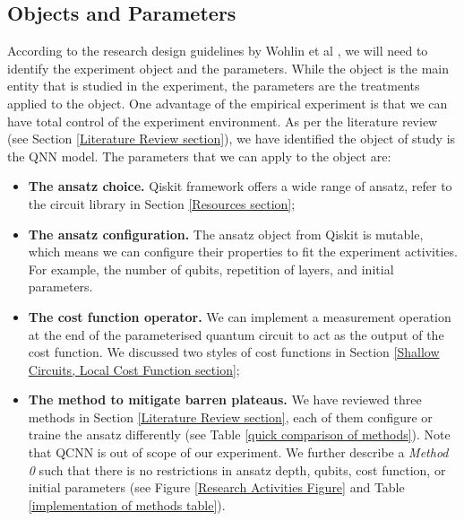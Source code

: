 \subsection{Objects and Parameters}\label{Objects section}
According to the research design guidelines by Wohlin et al \cite{wohlinExperimentationSoftwareEngineering2012}, we will need to identify the experiment object and the parameters.
While the object is the main entity that is studied in the experiment, the parameters are the treatments applied to the object.
One advantage of the empirical experiment is that we can have total control of the experiment environment.
As per the literature review (see Section \ref{Literature Review section}), we have identified the object of study is the QNN model.
The parameters that we can apply to the object are:
\begin{itemize}
    \item \textbf{The ansatz choice.} Qiskit framework offers a wide range of ansatz, refer to the circuit library in Section \ref{Resources section};
    \item \textbf{The ansatz configuration.} The ansatz object from Qiskit is mutable, which means we can configure their properties to fit the experiment activities. For example, the number of qubits, repetition of layers, and initial parameters.
    \item \textbf{The cost function operator.} We can implement a measurement operation at the end of the parameterised quantum circuit to act as the output of the cost function. We discussed two styles of cost functions in Section \ref{Shallow Circuits, Local Cost Function section};
    \item \textbf{The method to mitigate barren plateaus.} We have reviewed three methods in Section \ref{Literature Review section}, each of them configure or traine the ansatz differently (see Table \ref{quick comparison of methods}). Note that QCNN is out of scope of our experiment. We further describe a \emph{Method 0} such that there is no restrictions in ansatz depth, qubits, cost function, or initial parameters (see Figure \ref{Research Activities Figure} and Table \ref{implementation of methods table}).
\end{itemize}